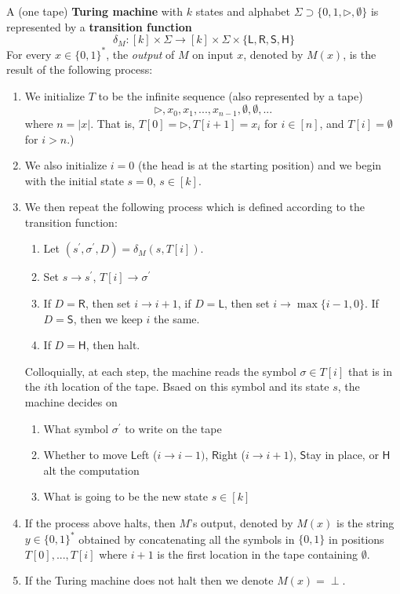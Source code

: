   \begin{definition}
    A (one tape) \textbf{Turing machine} with $k$ states and alphabet $\Sigma \supset \{0, 1, \triangleright, \emptyset\}$ is represented by a \textbf{transition function} 
    \[\delta_M: [k] \times \Sigma \longrightarrow [k] \times \Sigma \times \{\mathsf{L, R, S, H}\}\]
    For every $x \in \{0,1\}^*$, the \textit{output} of $M$ on input $x$, denoted by $M(x)$, is the result of the following process: 
    \begin{enumerate}
        \item We initialize $T$ to be the infinite sequence (also represented by a tape)
        \[\triangleright, x_0, x_1, ..., x_{n-1}, \emptyset, \emptyset, ...\]
        where $n = |x|$. That is, $T[0] = \triangleright, T[i+1] = x_i$ for $i \in [n]$, and $T[i] = \emptyset$ for $i>n$.)
        \item We also initialize $i = 0$ (the head is at the starting position) and we begin with the initial state $s=0$, $s \in [k]$. 
        \item We then repeat the following process which is defined according to the transition function: 
        \begin{enumerate}
            \item Let $(s^\prime, \sigma^\prime, D) = \delta_M (s, T[i])$.
            \item Set $s \rightarrow s^\prime$, $T[i] \rightarrow \sigma^\prime$
            \item If $D = \mathsf{R}$, then set $i \rightarrow i+1$, if $D = \mathsf{L}$, then set $i \rightarrow \max\{i-1,0\}$. If $D = \mathsf{S}$, then we keep $i$ the same. 
            \item If $D = \mathsf{H}$, then halt. 
        \end{enumerate}
        Colloquially, at each step, the machine reads the symbol $\sigma \in T[i]$ that is in the $i$th location of the tape. Bsaed on this symbol and its state $s$, the machine decides on
        \begin{enumerate}
            \item What symbol $\sigma^\prime$ to write on the tape
            \item Whether to move $\mathsf{L}$eft ($i \rightarrow i-1)$, $\mathsf{R}$ight ($i \rightarrow i+1$), $\mathsf{S}$tay in place, or $\mathsf{H}$alt the computation 
            \item What is going to be the new state $s \in [k]$
        \end{enumerate}
        \item If the process above halts, then $M$'s output, denoted by $M(x)$ is the string $y \in \{0,1\}^*$ obtained by concatenating all the symbols in $\{0,1\}$ in positions $T[0], ..., T[i]$ where $i+1$ is the first location in the tape containing $\emptyset$. 
        \item If the Turing machine does not halt then we denote $M(x) = \perp$. 
    \end{enumerate}
  \end{definition}

